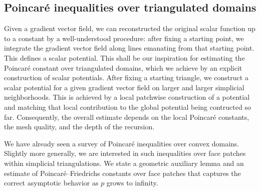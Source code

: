 \documentclass[a4paper]{amsart}
\begin{document}







\subsection{Poincar\'e inequalities over triangulated domains}

Given a gradient vector field, we can reconstructed the original scalar function up to a constant by a well-understood procedure: after fixing a starting point, we integrate the gradient vector field along lines emanating from that starting point. This defines a scalar potential. 
This shall be our inspiration for estimating the Poincar\'e constant over triangulated domains, which we achieve by an explicit construction of scalar potentials. 
After fixing a starting triangle, we construct a scalar potential for a given gradient vector field on larger and larger simplicial neighborhoods. This is achieved by a local patchwise construction of a potential and matching that local contribution to the global potential being contructed so far. 
Consequently, the overall estimate depends on the local Poincar\'e constants, the mesh quality, and the depth of the recursion. 


We have already seen a survey of Poincar\'e inequalities over convex domains. 
Slightly more generally, we are interested in such inequalities over face patches within simplicial triangulations. 
We state a geometric auxiliary lemma and an estimate of Poincar\'e--Friedrichs constants over face patches 
that captures the correct asymptotic behavior as $p$ grows to infinity.
\end{document}
